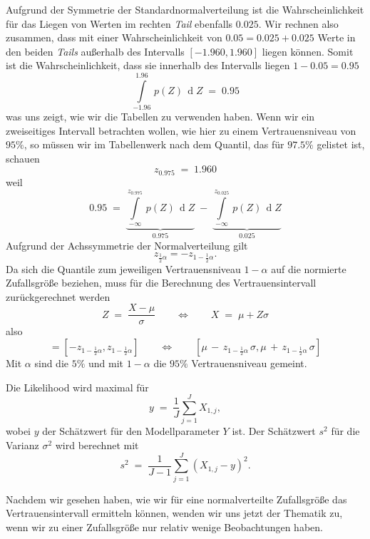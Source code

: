 Aufgrund der Symmetrie der Standardnormalverteilung ist die Wahrscheinlichkeit für das Liegen von
Werten im rechten \textsl{Tail} ebenfalls $0.025$. Wir rechnen also zusammen, dass mit
einer Wahrscheinlichkeit von $0.05 = 0.025+0.025$ Werte in den beiden \textsl{Tails} außerhalb
des Intervalls $[-1.960, 1.960]$ liegen können. Somit ist die Wahrscheinlichkeit, dass sie
innerhalb des Intervalls liegen $1 - 0.05 = 0.95$
\begin{equation}
\int\limits_{-1.96}^{1.96} \, p(Z) \, \operatorname{d} Z \; = \; 0.95
\end{equation}
was uns zeigt, wie wir die Tabellen zu verwenden haben.
Wenn wir ein zweiseitiges Intervall betrachten wollen, wie hier zu einem Vertrauensniveau
von $95 \%$, so müssen wir im Tabellenwerk nach dem Quantil, das für $97.5 \%$ gelistet
ist, schauen
$$
z_{0.975} \; = \; 1.960
$$
weil
$$
0.95 \; = \; 
\underbrace{\int\limits_{-\infty}^{z_{0.975}} \, p(Z) \, \operatorname{d} Z}_{0.975} \; - \;
\underbrace{\int\limits_{-\infty}^{z_{0.025}} \, p(Z) \, \operatorname{d} Z}_{0.025}
$$
Aufgrund der Achssymmetrie der Normalverteilung gilt 
$$
z_{\frac{1}{2}\alpha} = -z_{1-\frac{1}{2}\alpha} .
$$
Da sich die Quantile zum jeweiligen Vertrauensniveau $1-\alpha$ auf die normierte Zufallsgröße
beziehen, muss für die Berechnung des Vertrauensintervall zurückgerechnet werden
\begin{equation}
Z \; = \; \frac{X - \mu}{\sigma} \qquad \Leftrightarrow \qquad X \; = \; \mu + Z \sigma
\end{equation}
also
\begin{equation}
[z_{\frac{1}{2}\alpha}, z_{1-\frac{1}{2}\alpha}] = 
[-z_{1-\frac{1}{2}\alpha}, z_{1-\frac{1}{2}\alpha}]
 \qquad \Leftrightarrow  \qquad
[\mu \, - \, z_{1-\frac{1}{2}\alpha} \, \sigma, \mu \, + \, z_{1-\frac{1}{2}\alpha} \, \sigma]
\end{equation}
Mit $\alpha$ sind die $5 \%$ und mit $1-\alpha$ die $95 \%$ Vertrauensniveau gemeint.

Die Likelihood wird maximal für
\begin{equation}
y \; = \; \frac{1}{J} \sum_{j=1}^J X_{1,j} ,
\end{equation}
wobei $y$ der Schätzwert für den Modellparameter $Y$ ist.
Der Schätzwert $s^2$ für die Varianz $\sigma^2$ wird berechnet mit
\begin{equation}
s^2 \; = \; \frac{1}{J-1} \sum_{j=1}^J (X_{1,j} - y)^2 .
\end{equation}

Nachdem wir gesehen haben, wie wir für eine normalverteilte Zufallsgröße
das Vertrauensintervall ermitteln können, wenden wir uns jetzt der Thematik zu,
wenn wir zu einer Zufallsgröße nur relativ wenige Beobachtungen haben.

